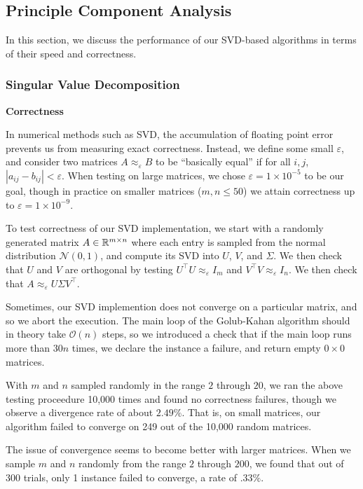 \subsection{Principle Component Analysis}

In this section, we discuss the performance of our SVD-based algorithms in terms 
of their speed and correctness.

\subsubsection{Singular Value Decomposition}

\begin{center}
    \textbf{Correctness}
\end{center}

In numerical methods such as SVD, the accumulation of floating point error prevents us from measuring exact correctness.
Instead, we define some small $\varepsilon$, and consider two matrices $A \approx_\varepsilon B$ to be ``basically equal'' if 
for all $i, j$, $|a_{ij} - b_{ij}| < \varepsilon$. When testing on large matrices, we chose $\varepsilon = 1 \times 10^{-5}$
to be our goal, though in practice on smaller matrices ($m, n \leq 50$) we attain correctness up to $\varepsilon = 1 \times 10^{-9}$.

To test correctness of our SVD implementation, we start with a randomly generated matrix $A \in \mathbb{R}^{m \times n}$
where each entry is sampled from the normal distribution $\mathcal N(0, 1)$, and compute its SVD into $U$, $V$, 
and $\Sigma$. We then check that $U$ and $V$ are orthogonal by testing $U^\top U \approx_\varepsilon I_m$ 
and $V^\top V \approx_\varepsilon I_n$. We then check that $A \approx_\varepsilon U \Sigma V^\top$. 

Sometimes, our SVD implemention does not converge on a particular matrix, and so we abort the execution. The main loop 
of the Golub-Kahan algorithm should in theory take $\mathcal O(n)$ steps, so we introduced a check that if the main loop
runs more than $30n$ times, we declare the instance a failure, and return empty $0 \times 0$ matrices.

With $m$ and $n$ sampled randomly in the range $2$ through $20$, we ran the above testing proceedure 10,000 times and 
found no correctness failures, though we observe a divergence rate of about $2.49\%$. That is, on small matrices, our 
algorithm failed to converge on 249 out of the 10,000 random matrices.

The issue of convergence seems to become better with larger matrices. When we sample $m$ and $n$ randomly from the range 
$2$ through $200$, we found that out of 300 trials, only 1 instance failed to converge, a rate of $.33\%$.


